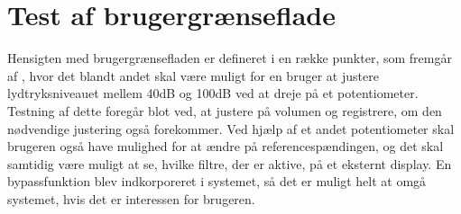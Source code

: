 \section{Test af brugergrænseflade}
\label{TestAfBrugergraenseflade}
Hensigten med brugergrænsefladen er defineret i en række punkter, som fremgår af , hvor det blandt andet skal være muligt for en bruger at justere lydtryksniveauet mellem 40dB og 100dB ved at dreje på et potentiometer. Testning af dette foregår blot ved, at justere på volumen og registrere, om den nødvendige justering også forekommer. Ved hjælp af et andet potentiometer skal brugeren også have mulighed for at ændre på referencespændingen, og det skal samtidig være muligt at se, hvilke filtre, der er aktive, på et eksternt display. En bypassfunktion  blev indkorporeret i systemet, så det er muligt helt at omgå systemet, hvis det er interessen for brugeren.


